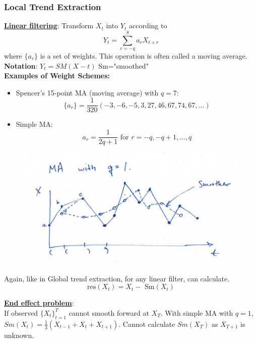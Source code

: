 \subsubsection{Local Trend Extraction}

\textbf{\underline{Linear filtering}}: Transform $X_t$ into $Y_t$ according to \[Y_t = \sum_{r=-q}^S a_rX_{t+r}\] where $\{a_r\}$ is a set of weights. This operation is often called a moving average.\\

\textbf{Notation}: $Y_t=SM(X-t)$ \quad Sm="smoothed" \\

\textbf{Examples of Weight Schemes:}
\begin{itemize}
    \item Spencer's 15-point MA (moving average) with $q=7$:
    \[\{a_r\}=\frac{1}{320}(-3,-6,-5,3,27,46,67,74,67,...)\]
    \item Simple MA:
    \[a_r=\frac{1}{2q+1} \text{ for } r=-q,-q+1,...,q\]
\end{itemize}


\begin{figure}[H]
\includegraphics[scale=0.3]{images/Screenshot 2024-03-30 at 14.22.35.jpg}
\centering
\end{figure}


Again, like in Global trend extraction, for any linear filter, can calculate.
\[
\boxed{\text{res}(X_t)=X_t-\text{ Sm}(X_t)}
\]

\textbf{\underline{End effect problem}}: \\

If observed $ \{X_t\}_{t=1}^T $ cannot smooth forward at $X_T$. With simple MA with $q=1$, $Sm(X_t)=\frac{1}{3}(X_{t-1}+X_t+X_{t+1})$. Cannot calculate $Sm(X_T)$ as $X_{T+1}$ is unknown. \\

